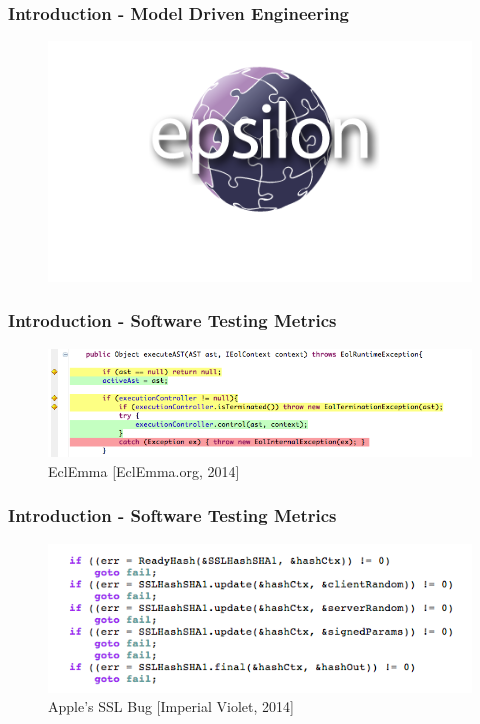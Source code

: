 \begin{frame}
\frametitle{Introduction - Model Driven Engineering}

	\begin{figure}
	\centering
	\includegraphics[scale=0.5]{./presentation/images/epsilon}
	\end{figure}
	\end{frame}

\begin{frame}
\frametitle{Introduction - Software Testing Metrics}

	\begin{figure}
		\centering
		\includegraphics[width=0.758\linewidth]{figures/EclEmma}
		\caption{EclEmma [EclEmma.org, 2014]}
	\end{figure}
\end{frame}

\begin{frame}
\frametitle{Introduction - Software Testing Metrics}

	\begin{figure}
		\centering
		\includegraphics[width=0.758\linewidth]{figures/appleBug.png}
		\caption{Apple's SSL Bug [Imperial Violet, 2014]}
	\end{figure}
\end{frame}


